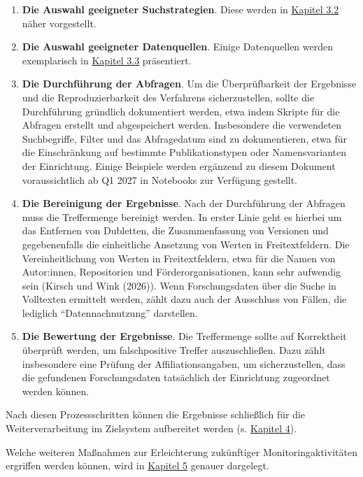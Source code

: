 \documentclass[
  ngerman,
  letterpaper,
  DIV=11]{scrreprt}
\providecommand{\tightlist}{%
  \setlength{\itemsep}{0pt}\setlength{\parskip}{0pt}}
\begin{document}
\begin{enumerate}
\def\labelenumi{\arabic{enumi}.}
\tightlist
\item
  \textbf{Die Auswahl geeigneter Suchstrategien}. Diese werden in
  \hyperref[suchstrategien]{Kapitel 3.2} näher vorgestellt.
\item
  \textbf{Die Auswahl geeigneter Datenquellen}. Einige Datenquellen
  werden exemplarisch in
  \hyperref[datenquellen-fuxfcr-die-direkte-suche]{Kapitel 3.3}
  präsentiert.
\item
  \textbf{Die Durchführung der Abfragen}. Um die Überprüfbarkeit der
  Ergebnisse und die Reproduzierbarkeit des Verfahrens sicherzustellen,
  sollte die Durchführung gründlich dokumentiert werden, etwa indem
  Skripte für die Abfragen erstellt und abgespeichert werden.
  Insbesondere die verwendeten Suchbegriffe, Filter und das Abfragedatum
  sind zu dokumentieren, etwa für die Einschränkung auf bestimmte
  Publikationstypen oder Namensvarianten der Einrichtung. Einige
  Beispiele werden ergänzend zu diesem Dokument voraussichtlich ab Q1
  2027 in Notebooks zur Verfügung gestellt.
\item
  \textbf{Die Bereinigung der Ergebnisse}. Nach der Durchführung der
  Abfragen muss die Treffermenge bereinigt werden. In erster Linie geht
  es hierbei um das Entfernen von Dubletten, die Zusammenfassung von
  Versionen und gegebenenfalls die einheitliche Ansetzung von Werten in
  Freitextfeldern. Die Vereinheitlichung von Werten in Freitextfeldern,
  etwa für die Namen von Autor:innen, Repositorien und
  Förderorganisationen, kann sehr aufwendig sein (Kirsch und Wink
  (2026)). Wenn Forschungsdaten über die Suche in Volltexten ermittelt
  werden, zählt dazu auch der Ausschluss von Fällen, die lediglich
  ``Datennachnutzung'' darstellen.
\item
  \textbf{Die Bewertung der Ergebnisse}. Die Treffermenge sollte auf
  Korrektheit überprüft werden, um falschpositive Treffer
  auszuschließen. Dazu zählt insbesondere eine Prüfung der
  Affiliationsangaben, um sicherzustellen, dass die gefundenen
  Forschungsdaten tatsächlich der Einrichtung zugeordnet werden können.
\end{enumerate}

Nach diesen Prozessschritten können die Ergebnisse schließlich für die
Weiterverarbeitung im Zielsystem aufbereitet werden (s.
\href{./4_Verwendung.qmd}{Kapitel 4}).

Welche weiteren Maßnahmen zur Erleichterung zukünftiger
Monitoringaktivitäten ergriffen werden können, wird in
\href{./5_Vorbereitung}{Kapitel 5} genauer dargelegt.
\end{document}
